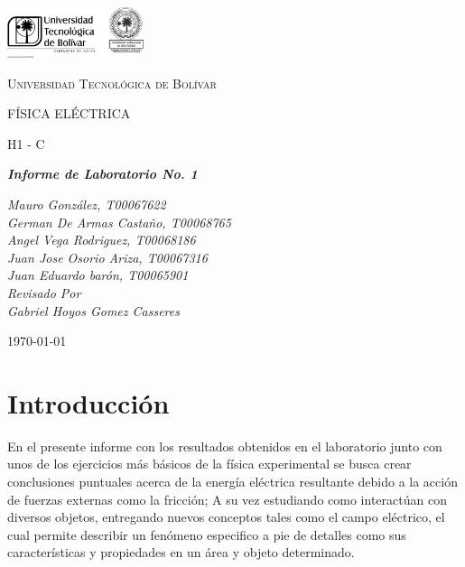 \documentclass[letterpaper, 12pt]{report}
\begin{document}
\begin{titlepage}
	\centering
	\includegraphics[width=0.3\textwidth]{Images/logo_utb.png}\par\vspace{1cm}
	{\scshape\LARGE Universidad Tecnológica de Bolívar \par}
	\vspace{1cm}

	{\scshape\Large FÍSICA ELÉCTRICA \par}
	\vspace{.2cm}

	{\scshape\Large H1 - C \par}
	\vspace{1cm}
	\slshape {\Large \bfseries{}Informe de Laboratorio No. 1 \\}
	\vspace{1cm}

	\slshape {\itshape{} Mauro González, T00067622 \\}
	\slshape {\itshape{} German De Armas Castaño, T00068765 \\}
	\slshape {\itshape{} Angel Vega Rodriguez, T00068186 \\}
	\slshape {\itshape{} Juan Jose Osorio Ariza, T00067316 \\}
	\slshape {\itshape{} Juan Eduardo barón, T00065901 \\}
	\vfill
	Revisado Por \\
	Gabriel Hoyos Gomez Casseres\\
	{\large \today\par}
\end{titlepage}

\section{Introducción}

En el presente informe con los resultados obtenidos en el laboratorio junto
con unos de los ejercicios más básicos de la física experimental se busca crear
conclusiones puntuales acerca de la energía eléctrica resultante debido a la
acción de fuerzas externas como la fricción; A su vez estudiando como
interactúan con diversos objetos, entregando nuevos conceptos tales como el
campo eléctrico, el cual permite describir un fenómeno especifico a pie de
detalles como sus características y propiedades en un área y objeto determinado.
\end{document}
